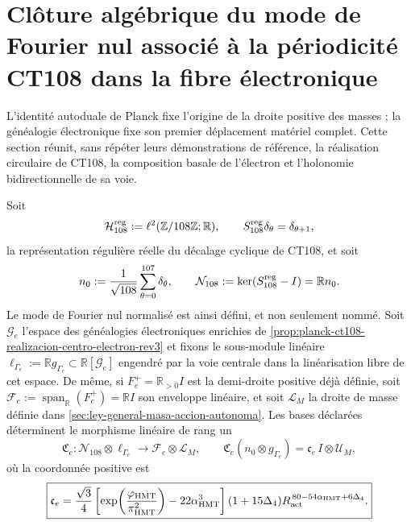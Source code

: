 \section{Clôture algébrique du mode de Fourier nul associé à la périodicité CT108 dans la fibre électronique}
\label{sec:clausura-nulo-material-electron-rev3}

L'identité autoduale de Planck fixe l'origine de la droite positive des
masses ; la généalogie électronique fixe son premier déplacement matériel
complet. Cette section réunit, sans répéter leurs démonstrations de référence,
la réalisation circulaire de CT108, la composition basale de l'électron et
l'holonomie bidirectionnelle de sa voie.

Soit
\[
 \mathcal H_{108}^{\rm reg}
 :=\ell^2(\mathbb Z/108\mathbb Z;\mathbb R),
 \qquad
 S_{108}^{\rm reg}\delta_\theta=\delta_{\theta+1},
\]
la représentation régulière réelle du décalage cyclique de CT108, et soit
\[
 n_0:=\frac1{\sqrt{108}}\sum_{\theta=0}^{107}\delta_\theta,
 \qquad
 \mathcal N_{108}:=\ker(S_{108}^{\rm reg}-I)=\mathbb R n_0.
\]
Le mode de Fourier nul normalisé est ainsi défini, et non seulement nommé.
Soit \(\mathcal G_e\) l'espace des généalogies électroniques enrichies de
\cref{prop:planck-ct108-realizacion-centro-electron-rev3} et fixons le
sous-module linéaire
\(\ell_{\Gamma_e}:=\mathbb R g_{\Gamma_e}
\subset\mathbb R[\mathcal G_e]\) engendré par la voie centrale dans la
linéarisation libre de cet espace. De même, si
\(F_e^+=\mathbb R_{>0}I\) est la demi-droite positive déjà définie, soit
\(\mathcal F_e:=\operatorname{span}_{\mathbb R}(F_e^+)=\mathbb R I\) son
enveloppe linéaire, et soit
\(\mathcal L_M\) la droite de masse définie dans
\cref{sec:ley-general-masa-accion-autonoma}. Les bases déclarées déterminent
le morphisme linéaire de rang un
\begin{equation}
 \mathfrak C_e:
 \mathcal N_{108}\otimes\ell_{\Gamma_e}
 \longrightarrow \mathcal F_e\otimes\mathcal L_M,
 \qquad
 \mathfrak C_e(n_0\otimes g_{\Gamma_e})
 =\mathfrak c_e\,I\otimes\mathcal U_M,
 \label{eq:morfismo-clausura-nulo-material-electron-rev3}
\end{equation}
où la coordonnée positive est
\begin{equation}
 \boxed{
 \mathfrak c_e=
 \frac{\sqrt3}{4}
 \left[
  \exp\!\left(\frac{\varphi_{\rm HMT}}{\pi_{\rm HMT}^{2}}\right)
  -22\alpha_{\rm HMT}^{3}
 \right]
 (1+15\Delta_4)
 R_{\rm act}^{\,80-54\alpha_{\rm HMT}+6\Delta_4}.}
 \label{eq:coordenada-clausura-nulo-material-electron-rev3}
\end{equation}


